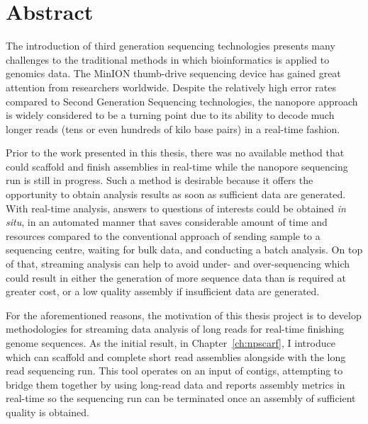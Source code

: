 \chapter*{Abstract}
The introduction of third generation sequencing technologies presents many challenges to the traditional methods in which bioinformatics is applied to genomics data. The MinION thumb-drive sequencing device has gained great attention from researchers worldwide. Despite the relatively high error rates compared to Second Generation Sequencing technologies, the nanopore approach is widely considered to be a turning point due to its ability to decode much longer reads (tens or even hundreds of kilo base pairs) in a real-time fashion.

Prior to the work presented in this thesis, there was no available method that could scaffold and finish assemblies in real-time while the nanopore sequencing run is still in progress. Such a method is desirable because it offers the opportunity to obtain analysis results as soon as sufficient data are generated.
With real-time analysis, answers to questions of interests
could be obtained \emph{in situ}, in an automated manner that saves considerable amount of time and resources compared to the conventional approach of sending sample to a sequencing centre, waiting for bulk data, and conducting a batch analysis. 
On top of that, streaming analysis can help to avoid under- and over-sequencing which could result in either the generation of more sequence data than is required at greater cost, or a low quality assembly if insufficient data are generated.

For the aforementioned reasons, the motivation of this thesis project is to develop methodologies for streaming data analysis of long reads for real-time finishing genome sequences.
As the initial result, in Chapter~\ref{ch:npscarf}, I introduce \npscarf{} which can scaffold and complete short read assemblies alongside with the long read sequencing run. This tool operates on an input of contigs, attempting to bridge them together by using long-read data and reports assembly metrics in real-time so the sequencing run can be terminated once an assembly of sufficient quality is obtained.

